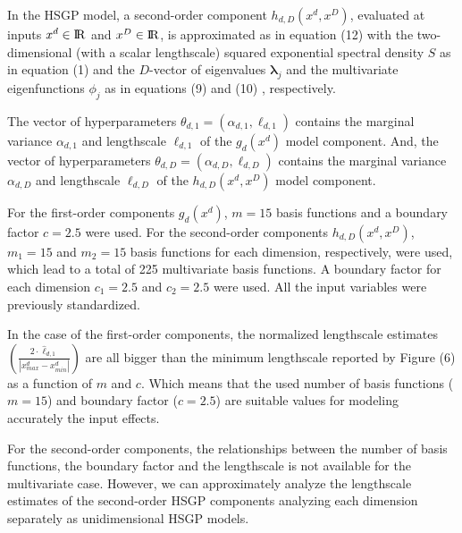 \documentclass[onecolumn,a4paper,11pt]{article}
\begin{document}
\noindent In the HSGP model, a second-order component $h_{d,D}(x^d,x^D)$, evaluated at inputs $x^d \in {\rm I\!R}$ and $x^D \in {\rm I\!R}$, is approximated as in equation (12)%
 with the two-dimensional (with a scalar lengthscale) squared exponential spectral density $S$ as in equation (1) %
 and the $D$-vector of eigenvalues $\bm{\lambda}_j$ and the multivariate eigenfunctions $\phi_j$ as in equations (9) %
 and (10)%
 , respectively. 

The vector of hyperparameters $\theta_{d,1}=(\alpha_{d,1},\ell_{d,1})$ contains the marginal variance $\alpha_{d,1}$ and lengthscale $\ell_{d,1}$ of the $g_d(x^d)$ model component. And, the vector of hyperparameters $\theta_{d,D}=(\alpha_{d,D},\ell_{d,D})$ contains the marginal variance $\alpha_{d,D}$ and lengthscale $\ell_{d,D}$ of the $h_{d,D}(x^d,x^D)$ model component.
 

For the first-order components $g_d(x^d)$, $m=15$ basis functions and a boundary factor $c=2.5$ were used. For the second-order components $h_{d,D}(x^d,x^D)$, $m_1=15$ and $m_2=15$ basis functions for each dimension, respectively, were used, which lead to a total of 225 multivariate basis functions. A boundary factor for each dimension $c_1=2.5$ and $c_2=2.5$ were used. All the input variables were previously standardized.

In the case of the first-order components, the normalized lengthscale estimates $\left(\frac{2\cdot \hat{\ell}_{d,1}}{|x^d_{max}-x^d_{min}|}\right)$ are all bigger than the minimum lengthscale reported by Figure (6) %
as a function of $m$ and $c$. Which means that the used number of basis functions ($m=15$) and boundary factor ($c=2.5$) are suitable values for modeling accurately the input effects.

For the second-order components, the relationships between the number of basis functions, the boundary factor and the lengthscale is not available for the multivariate case. However, we can approximately analyze the lengthscale estimates of the second-order HSGP components analyzing each dimension separately as unidimensional HSGP models.
\end{document}

